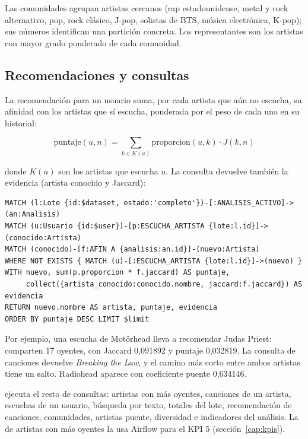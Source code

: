 Las comunidades agrupan artistas cercanos (rap estadounidense, metal y rock alternativo, pop, rock clásico, J-pop, solistas de BTS, música electrónica, K-pop); sus números identifican una partición concreta. Los representantes son los artistas con mayor grado ponderado de cada comunidad.

\subsection{Recomendaciones y consultas}

La recomendación para un usuario suma, por cada artista que aún no escucha, su afinidad con los artistas que sí escucha, ponderada por el peso de cada uno en su historial:

\[
\text{puntaje}(u, n) = \sum_{k \in K(u)} \text{proporcion}(u,k) \cdot J(k,n)
\]

donde $K(u)$ son los artistas que escucha $u$. La consulta devuelve también la evidencia (artista conocido y Jaccard):

\begin{lstlisting}[language=Cypher]
MATCH (l:Lote {id:$dataset, estado:'completo'})-[:ANALISIS_ACTIVO]->(an:Analisis)
MATCH (u:Usuario {id:$user})-[p:ESCUCHA_ARTISTA {lote:l.id}]->(conocido:Artista)
MATCH (conocido)-[f:AFIN_A {analisis:an.id}]-(nuevo:Artista)
WHERE NOT EXISTS { MATCH (u)-[:ESCUCHA_ARTISTA {lote:l.id}]->(nuevo) }
WITH nuevo, sum(p.proporcion * f.jaccard) AS puntaje,
     collect({artista_conocido:conocido.nombre, jaccard:f.jaccard}) AS evidencia
RETURN nuevo.nombre AS artista, puntaje, evidencia
ORDER BY puntaje DESC LIMIT $limit
\end{lstlisting}

Por ejemplo, una escucha de Motörhead lleva a recomendar Judas Priest: comparten 17 oyentes, con Jaccard 0,091892 y puntaje 0,032819. La consulta de canciones devuelve \emph{Breaking the Law}, y el camino más corto entre ambos artistas tiene un salto. Radiohead aparece con coeficiente puente 0,634146.

 ejecuta el resto de consultas: artistas con más oyentes, canciones de un artista, escuchas de un usuario, búsqueda por texto, totales del lote, recomendación de canciones, comunidades, artistas puente, diversidad e indicadores del análisis. La de artistas con más oyentes la usa Airflow para el KPI 5 (sección~\ref{cap:kpis}).
